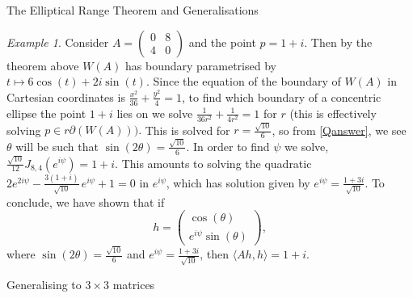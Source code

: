 \documentclass[12pt]{article}
\theoremstyle{plain}
\theoremstyle{definition}
\theoremstyle{remark}
\newtheorem{Example}[Theorem]{Example}
\numberwithin{equation}{section}
\begin{document}
\begin{section}{The Elliptical Range Theorem and Generalisations}
\begin{Example}
Consider $A = \begin{pmatrix}
    0 & 8 \\
    4 & 0
\end{pmatrix}$ and the point $p = 1 + i$. Then by the theorem above $W(A)$ has boundary parametrised by $t \mapsto 6 \cos (t) + 2i \sin (t)$. Since the equation of the boundary of $W(A)$ in Cartesian coordinates is $\frac{x^2}{36} + \frac{y^2}{4} = 1$, to find which boundary of a concentric ellipse the point $1+i$ lies on we solve $\frac{1}{36r^2} + \frac{1}{4r^2} = 1$ for $r$ (this is effectively solving $p \in r \partial(W(A)) ).$ This is solved for $r = \frac{\sqrt{10}}{6}$, so from \eqref{Qanswer}, we see $\theta $ will be such that $\sin ( 2 \theta) = \frac{\sqrt{10}}{6}$. In order to find $\psi$ we solve, $\frac{\sqrt{10}}{12}J_{8,4}(e^{i \psi}) = 1+i$. This amounts to solving the quadratic $2e^{2i \psi} - \frac{3(1+i)}{\sqrt{10}}\,e^{i \psi} + 1 = 0$ in $e^{i \psi}$, which has solution given by $ e^{i \psi} =\frac{1 + 3i}{\sqrt{10}}$. To conclude, we have shown that if 
$$
h = \begin{pmatrix}
        \cos (\theta) \\
        e^{i \psi} \sin (\theta)
    \end{pmatrix},
$$
where $\sin ( 2 \theta) = \frac{\sqrt{10}}{6}$ and $e^{i \psi} =\frac{1 + 3i}{\sqrt{10}}$, then $\langle Ah,h \rangle  = 1 + i$.
\end{Example}


\begin{subsection}{Generalising to $3 \times 3$ matrices}\label{2.2}



\end{subsection}
\end{section}
\end{document}
